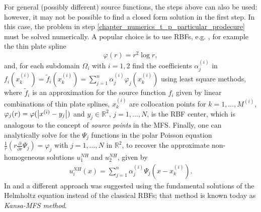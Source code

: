 \begin{remark}
    For general (possibly different) source functions, the steps above can also be used: however, it may not be possible to find a closed form solution in the first step. In this case, the problem in step \ref{chapter_numerics_t_p_particular_prodecure} must be solved numerically. A popular choice is to use \acp{RBF}, e.g. \cite{golberg1996improved}, for example the thin plate spline
    \[
        \varphi(r) = r^2 \log r,     
    \]
    and, for each subdomain \(\Omega_i\) with \(i=1,2\) find the coefficients \(\alpha_j^{(i)}\) in \(f_i(x_k^{(i)}) =\tilde{f}_i(x_k^{(i)}) = \sum_{j=1}^{n} \alpha_j^{(i)} \varphi_j(x_k^{(i)})\) using least square methods, where \(\tilde{f}_i\) is an approximation for the source function \(f_i\) given by linear combinations of thin plate splines, \(x_k^{(i)}\) are collocation points for \(k=1,\dots,M^{(i)}\), \(\varphi_j(r) = \varphi(\abs{x^{(i)}-y_j})\) and \(y_j \in \mathbb{R}^2, \, j =1,\dots, N\), is the \ac{RBF} center, which is analogous to the concept of \textit{source points} in the \ac{MFS}. Finally, one can analytically solve for the \(\Psi_j\) functions in the polar Poisson equation \(\frac{1}{r}\left(r \frac{\partial}{\partial r}\Psi_j\right)  = \varphi_j\) with \(j=1,\dots,N\) in \(\mathbb{R}^2\), to recover the approximate non-homogeneous solutions \(u_1^{NH}\) and \(u_2^{NH}\), given by
    \begin{align*}
        u_i^{NH}(x) = \sum_{j=1}^{n} \alpha_j^{(i)} \Psi_j(x-x_k^{(i)}).
    \end{align*}
    In \cite{alves2005new} and \cite{alves2021domain} a different approach was suggested using the fundamental solutions of the Helmholtz equation instead of the classical \acp{RBF}; that method is known today as \textit{Kansa-MFS method}.
\end{remark}

